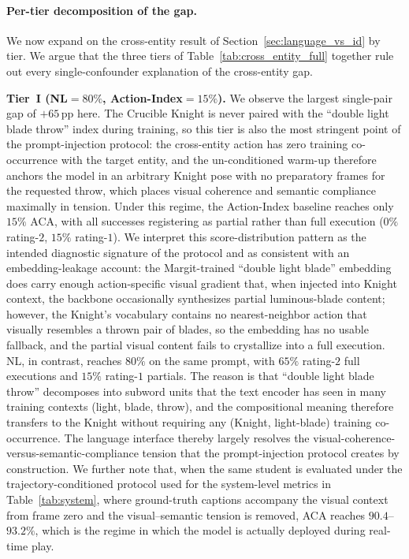 \paragraph{Per-tier decomposition of the gap.}
We now expand on the cross-entity result of Section~\ref{sec:language_vs_id} by tier. We argue that the three tiers of Table~\ref{tab:cross_entity_full} together rule out every single-confounder explanation of the cross-entity gap.

\textbf{Tier~$\mathbf{I}$ (NL$=80\%$, Action-Index$=15\%$).}
We observe the largest single-pair gap of $+65$\,pp here. The Crucible Knight is never paired with the ``double light blade throw'' index during training, so this tier is also the most stringent point of the prompt-injection protocol: the cross-entity action has zero training co-occurrence with the target entity, and the un-conditioned warm-up therefore anchors the model in an arbitrary Knight pose with no preparatory frames for the requested throw, which places visual coherence and semantic compliance maximally in tension. Under this regime, the Action-Index baseline reaches only $15\%$ ACA, with all successes registering as partial rather than full execution ($0\%$ rating-$2$, $15\%$ rating-$1$). We interpret this score-distribution pattern as the intended diagnostic signature of the protocol and as consistent with an embedding-leakage account: the Margit-trained ``double light blade'' embedding does carry enough action-specific visual gradient that, when injected into Knight context, the backbone occasionally synthesizes partial luminous-blade content; however, the Knight's vocabulary contains no nearest-neighbor action that visually resembles a thrown pair of blades, so the embedding has no usable fallback, and the partial visual content fails to crystallize into a full execution. NL, in contrast, reaches $80\%$ on the same prompt, with $65\%$ rating-$2$ full executions and $15\%$ rating-$1$ partials. The reason is that ``double light blade throw'' decomposes into subword units that the text encoder has seen in many training contexts (light, blade, throw), and the compositional meaning therefore transfers to the Knight without requiring any (Knight, light-blade) training co-occurrence. The language interface thereby largely resolves the visual-coherence-versus-semantic-compliance tension that the prompt-injection protocol creates by construction. We further note that, when the same student is evaluated under the trajectory-conditioned protocol used for the system-level metrics in Table~\ref{tab:system}, where ground-truth captions accompany the visual context from frame zero and the visual--semantic tension is removed, ACA reaches $90.4$--$93.2\%$, which is the regime in which the model is actually deployed during real-time play.

